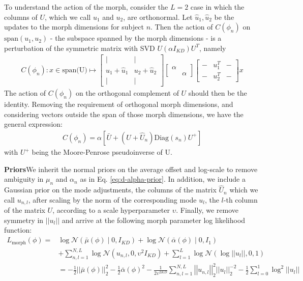 \documentclass{article}         %
\newcommand{\NN}{\mathcal{N}}
\newcommand{\mat}[1]{\begin{matrix} #1 \end{matrix}}
\newcommand{\norm}[1]{\left|\left| #1 \right|\right|}
\newcommand{\pn}[1]{\left( #1 \right)}
\newcommand{\bc}[1]{\left[ #1 \right]}
\begin{document}
To understand the action of the morph, consider the $L=2$ case in which the columns of $U$, which we call $u_1$ and $u_2$, are orthonormal. Let $\hat{u}_1, \hat{u}_2$ be the updates to the morph dimensions for subject $n$. Then the action of $C(\phi_n)$ on $\text{span}(u_1, u_2)$ - the subspace spanned by the morph dimensions - is a perturbation of the symmetric matrix with SVD $U (\alpha I_{KD}) U^T$, namely
\begin{align}
    C(\phi_n) : x\in \text{span(U)} \mapsto \bc{\mat{ | & | \\ u_1 + \hat{u}_1 & u_2 + \hat{u}_2 \\ | & |  }}
    \bc{\mat{ \alpha & \\ & \alpha }}
    \bc{\mat{ - & u_1^T & - \\ - & u_2^T & -}}x
\end{align}
The action of $C(\phi_n)$ on the orthogonal complement of $U$ should then be the identity. Removing the requirement of orthogonal morph dimensions, and considering vectors outside the span of those morph dimensions, we have the general expression:
\begin{align}
    C(\phi_n) = \alpha \bc{ \bar{U} + \pn{U + \hat{U}_n}\text{Diag}\pn{s_n}U^+ }
\end{align}
with $U^+$ being the Moore-Penrose pseudoinverse of U.

\textbf{Priors}\quad We inherit the normal priors on the average offset and log-scale to remove ambiguity in $\mu_n$ and $\alpha_n$ as in Eq. \ref{eq:d-alpha-prior}. In addition, we include a Gaussian prior on the mode adjustments, the columns of the matrix $\hat{U}_n$ which we call $u_{n,l}$,  after scaling by the norm of the corresponding mode $u_l$, the $l$-th column of the matrix $U$, according to a scale hyperparameter $\upsilon$. Finally, we remove symmetry in $\norm{u_l}$ and arrive at the following morph parameter log likelihood function:
\begin{align}
    L_{\text{morph}}(\phi) =& \log \NN\pn{\bar{\mu}(\phi) \mid 0, I_{KD}} + \log \NN\pn{\bar{\alpha}(\phi) \mid 0, I_1} \\
    &+ \sum_{n,l=1}^{N,L}\log \NN(u_{n,l}, 0, \upsilon^2 I_{KD}) + \sum_{l=1}^L \log\NN(\log \norm{u_l}, 0, 1)\\
    &= -\frac{1}{2}\norm{\bar{\mu}(\phi)}_2^2 - \frac{1}{2}\bar{\alpha}(\phi)^2 - \frac{1}{2\upsilon^{2KD}}\sum_{n,l=1}^{N,L}\norm{u_{n, l}}_2^2 \norm{u_l}_2^{-2} - \frac{1}{2}\sum_{l=0}^1 \log^2 \norm{u_l}
\end{align}
\end{document}
